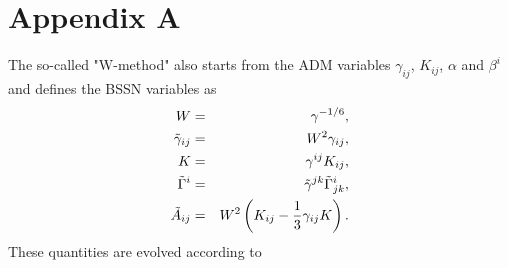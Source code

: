 \documentclass[useAMS,usenatbib]{iopart}
\begin{document}
\section{Appendix A}
 The so-called "W-method" \cite{marronetti08,tichy07} also starts from the ADM variables 
$\gamma_{ij}$, $K_{ij}$, $\alpha$ and
$\beta^{i}$ and  defines the BSSN variables as
\begin{eqnarray}
  W & = & \gamma^{-1/6}, \\
  \tilde{\gamma}_{ij} & = & W^2 \gamma_{ij}, \\
  K & = & \gamma^{ij} K_{ij}, \\
  \tilde{\Gamma}^{i} & = & \tilde{\gamma}^{jk} \tilde{\Gamma}^{i}_{jk}, \\
  \tilde{A}_{ij} & = & W^2\left ( K_{ij}-\frac{1}{3}\gamma_{ij} K\right ).
\end{eqnarray}
These quantities are evolved according to 
\end{document}
